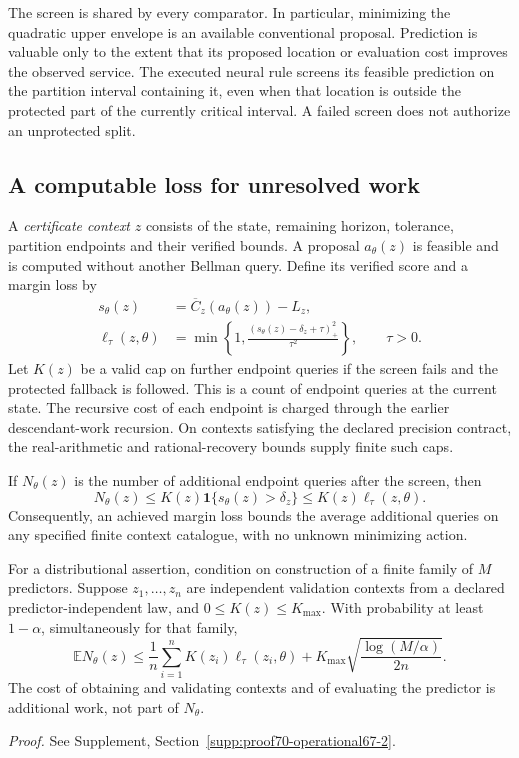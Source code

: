 The screen is shared by every comparator. In particular, minimizing the quadratic upper envelope is an available conventional proposal. Prediction is valuable only to the extent that its proposed location or evaluation cost improves the observed service. The executed neural rule screens its feasible prediction on the partition interval containing it, even when that location is outside the protected part of the currently critical interval. A failed screen does not authorize an unprotected split.

\subsection{A computable loss for unresolved work}
A \emph{certificate context} $z$ consists of the state, remaining horizon, tolerance, partition endpoints and their verified bounds. A proposal $a_\theta(z)$ is feasible and is computed without another Bellman query. Define its verified score and a margin loss by
\begin{align}
 s_\theta(z)&=\overline C_z(a_\theta(z))-L_z,\label{eq:score67}\\
 \ell_\tau(z,\theta)&=\min\left\{1,
       \frac{(s_\theta(z)-\delta_z+\tau)_+^2}{\tau^2}\right\},
       \qquad \tau>0.\label{eq:work-loss67}
\end{align}
Let $K(z)$ be a valid cap on further endpoint queries if the screen fails and the protected fallback is followed. This is a count of endpoint queries at the current state. The recursive cost of each endpoint is charged through the earlier descendant-work recursion. On contexts satisfying the declared precision contract, the real-arithmetic and rational-recovery bounds supply finite such caps.

\begin{theorem}\label{thm:work-loss67}
If $N_\theta(z)$ is the number of additional endpoint queries after the screen, then
\begin{equation}\label{eq:work-bound67}
 N_\theta(z)\le K(z)\mathbf1\{s_\theta(z)>\delta_z\}
                    \le K(z)\ell_\tau(z,\theta).
\end{equation}
Consequently, an achieved margin loss bounds the average additional queries on any specified finite context catalogue, with no unknown minimizing action.

For a distributional assertion, condition on construction of a finite family of $M$ predictors. Suppose $z_1,\ldots,z_n$ are independent validation contexts from a declared predictor-independent law, and $0\le K(z)\le K_{\max}$. With probability at least $1-\alpha$, simultaneously for that family,
\begin{equation}\label{eq:work-validation67}
 \mathbb E N_\theta(z)\le
 \frac1n\sum_{i=1}^n K(z_i)\ell_\tau(z_i,\theta)
 +K_{\max}\sqrt{\frac{\log(M/\alpha)}{2n}}.
\end{equation}
The cost of obtaining and validating contexts and of evaluating the predictor is additional work, not part of $N_\theta$.
\end{theorem}
\noindent\emph{Proof.} See Supplement, Section~\ref{supp:proof70-operational67-2}.


